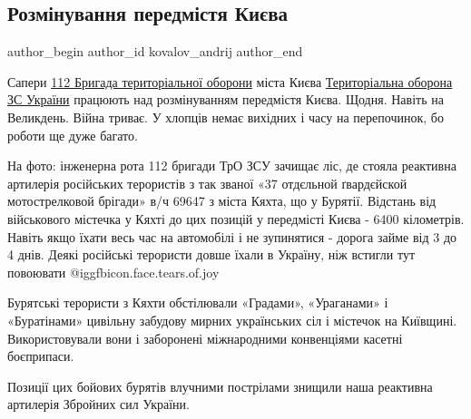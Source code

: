  
 
 
 
 
 
\subsection{Розмінування передмістя Києва}
\label{sec:25_04_2022.fb.kovalov_andrij.1.razminirovanie_predmestij_kieva}
 
\ifcmt
 author_begin
   author_id kovalov_andrij
 author_end
\fi

Сапери \href{https://www.facebook.com/112btro}{112 Бригада територіальної
оборони} міста Києва
\href{https://www.facebook.com/TerritorialDefenseForces}{Територіальна оборона
ЗС України} працюють над розмінуванням передмістя Києва. Щодня. Навіть на
Великдень. Війна триває. У хлопців немає вихідних і часу на перепочинок, бо
роботи ще дуже багато.


На фото: інженерна рота 112 бригади ТрО ЗСУ зачищає ліс, де стояла реактивна
артилерія російських терористів з так званої «37 отдєльной ґвардєйской
мотострелковой брігади» в/ч 69647 з міста Кяхта, що у Бурятії. Відстань від
військового містечка у Кяхті до цих позицій у передмісті Києва - 6400
кілометрів. Навіть якщо їхати весь час на автомобілі і не зупинятися - дорога
займе від 3 до 4 днів. Деякі російські терористи довше їхали в Україну, ніж
встигли тут повоювати  @igg{fbicon.face.tears.of.joy} 


Бурятські терористи з Кяхти обстілювали «Градами», «Ураганами» і «Буратінами»
цивільну забудову мирних українських сіл і містечок на Київщині.
Використовували вони і заборонені міжнародними конвенціями касетні боєприпаси. 

Позиції цих бойових бурятів влучними пострілами знищили наша реактивна
артилерія Збройних сил України. 

